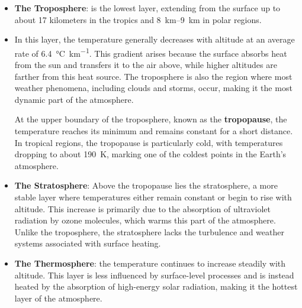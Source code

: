 \begin{itemize}
	\item \textbf{The Troposphere}: is the lowest layer, extending from the surface up to about 17 kilometers in the tropics and
	      \qtyrange{8}{9}{\kilo\meter} in polar regions.
	\item In this layer, the temperature generally decreases with altitude at an average rate of \qty{6.4}{\celsius.\kilo\meter^{-1}}. This gradient arises because the surface absorbs heat from the sun and transfers it to the air above, while higher altitudes are farther from this heat source. The troposphere is also the region where most weather phenomena, including clouds and storms, occur, making it the most dynamic part of the atmosphere.

	      At the upper boundary of the troposphere, known as the \textbf{tropopause}, the temperature reaches its minimum and remains constant for a short distance. In tropical regions, the tropopause is particularly cold, with temperatures dropping to about 190~K, marking one of the coldest points in the Earth's atmosphere.

	\item \textbf{The Stratosphere}: Above the tropopause lies the stratosphere, a more stable layer where temperatures either remain constant or begin to rise with altitude. This increase is primarily due to the absorption of ultraviolet radiation by ozone molecules, which warms this part of the atmosphere. Unlike the troposphere, the stratosphere lacks the turbulence and weather systems associated with surface heating.

	\item \textbf{The Thermosphere}: the temperature continues to increase steadily with altitude. This layer is less influenced by surface-level processes and is instead heated by the absorption of high-energy solar radiation, making it the hottest layer of the atmosphere.
\end{itemize}


